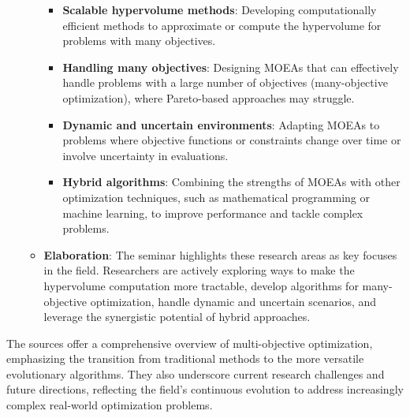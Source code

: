 \documentclass[
]{article}
\begin{document}
\begin{enumerate}
\begin{itemize}
    \begin{itemize}
    
    \item
      \textbf{Scalable hypervolume methods}: Developing computationally
      efficient methods to approximate or compute the hypervolume for
      problems with many objectives.
    \item
      \textbf{Handling many objectives}: Designing MOEAs that can
      effectively handle problems with a large number of objectives
      (many-objective optimization), where Pareto-based approaches may
      struggle.
    \item
      \textbf{Dynamic and uncertain environments}: Adapting MOEAs to
      problems where objective functions or constraints change over time
      or involve uncertainty in evaluations.
    \item
      \textbf{Hybrid algorithms}: Combining the strengths of MOEAs with
      other optimization techniques, such as mathematical programming or
      machine learning, to improve performance and tackle complex
      problems.
    \end{itemize}
  \item
    \textbf{Elaboration}: The seminar highlights these research areas as
    key focuses in the field. Researchers are actively exploring ways to
    make the hypervolume computation more tractable, develop algorithms
    for many-objective optimization, handle dynamic and uncertain
    scenarios, and leverage the synergistic potential of hybrid
    approaches.
  \end{itemize}
\end{enumerate}

The sources offer a comprehensive overview of multi-objective
optimization, emphasizing the transition from traditional methods to the
more versatile evolutionary algorithms. They also underscore current
research challenges and future directions, reflecting the field's
continuous evolution to address increasingly complex real-world
optimization problems.
\end{document}
